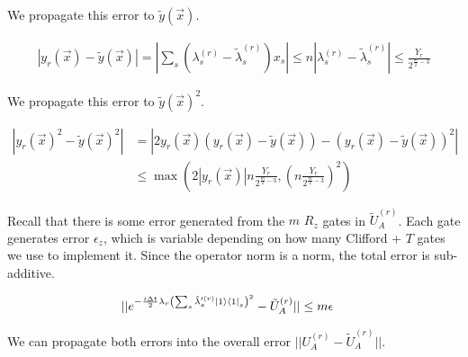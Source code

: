 We propagate this error to $\tilde{y}(\vec{x})$.

\begin{equation}
    \begin{split}
        |y_r(\vec{x}) - \tilde{y}(\vec{x})| = |\sum_s (\lambda^{(r)}_s - \tilde{\lambda}^{(r)}_s)x_s| \leq n|\lambda^{(r)}_s - \tilde{\lambda}^{(r)}_s| \leq \frac{Y_r}{2^{\frac{m}{2} - 3}}
    \end{split}
\end{equation}

We propagate this error to $\tilde{y}(\vec{x})^2$.

\begin{equation}
    \begin{split}
        |y_r(\vec{x})^2 - \tilde{y}(\vec{x})^2| &= |2y_r(\vec{x})(y_r(\vec{x}) - \tilde{y}(\vec{x})) - (y_r(\vec{x}) - \tilde{y}(\vec{x}))^2| \\
        &\leq \max\left(2|y_r(\vec{x})|n\frac{Y_r}{2^{\frac{m}{2} - 3}}, \left(n\frac{Y_r}{2^{\frac{m}{2} - 3}}\right)^2\right)
    \end{split}
\end{equation}

Recall that there is some error generated from the $m$ $R_z$ gates in $\tilde{U}_A^{(r)}$. Each gate generates error $\epsilon_z$, which is variable depending on how many Clifford + $T$ gates we use to implement it. Since the operator norm is a norm, the total error is sub-additive.

\begin{equation}
    \begin{split}
        ||e^{-\frac{i\Delta t}{2}\lambda_r\left(\sum_s \tilde{\lambda}'^{(r)}_s \ket{1}\bra{1}_s\right)^2} - \tilde{U}_A^{(r)}|| &\leq m\epsilon
    \end{split}
\end{equation}

We can propagate both errors into the overall error $||U_A^{(r)} - \tilde{U}_A^{(r)}||$.

